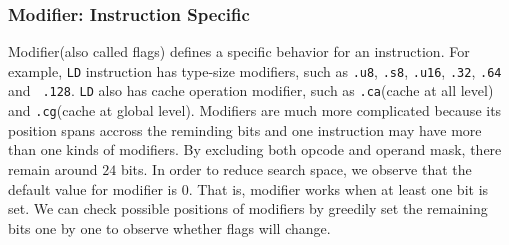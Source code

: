 \subsubsection{Modifier: Instruction Specific}

Modifier(also called flags) defines a specific behavior for an instruction. For example,
{\tt LD} instruction has type-size modifiers, such as {\tt .u8}, {\tt .s8}, {\tt .u16}, {\tt .32}, {\tt .64} and {\tt 
.128}. {\tt LD} also has cache operation modifier, such as {\tt .ca}(cache at all level) and {\tt .cg}(cache at global 
level). Modifiers are much more complicated because its position spans accross the reminding bits and one instruction 
may have more than one kinds of modifiers. By excluding both opcode and operand mask, there remain around $24$ bits. In 
order to reduce search space, we observe that the default value for modifier is $0$. That is, modifier works when at 
least one bit is set. We can check possible positions of modifiers by greedily set the remaining bits one by one to 
observe whether flags will change.


